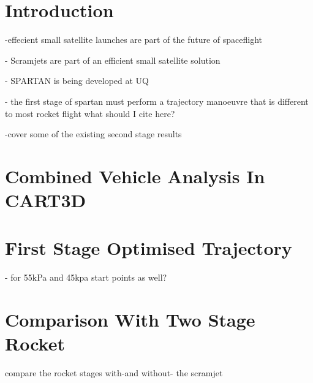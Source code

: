 \documentclass{AIAA}
\begin{document}
\section{Introduction}
-effecient small satellite launches are part of the future of spaceflight 

- Scramjets are part of an efficient small satellite solution

- SPARTAN is being developed at UQ

- the first stage of spartan must perform a trajectory manoeuvre that is different to most rocket flight
what should I cite here?

-cover some of the existing second stage results


\section{Combined Vehicle Analysis In CART3D}

\section{First Stage Optimised Trajectory}

- for 55kPa and 45kpa start points as well?


\section{Comparison With Two Stage Rocket}
compare the rocket stages with-and without- the scramjet
\end{document}
